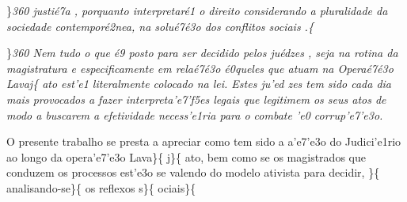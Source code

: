  \ltrch{} 
\par \}\pard \ltrpar\qj {}\sl360\widctlpar\wrapdefault\aspalpha\aspnum\faauto\adjustright{} {\rtlch{}  \ltrch{}  justi\'e7a}{\rtlch{}  \ltrch{} 
 , porquanto interpretar\'e1 o direito considerando}{\rtlch{}  \ltrch{}   a pluralidade da sociedade contempor\'e2nea, }{\rtlch{}  \ltrch{}  
na solu\'e7\'e3o }{\rtlch{}  \ltrch{}  dos conflitos sociais}{\rtlch{}  \ltrch{}  .}\{\rtlch{}
 \ltrch{}
\\
\par \}\pard \ltrpar\qj {}\sl360\widctlpar\wrapdefault\aspalpha\aspnum\faauto\adjustright{} {\rtlch{}  \ltrch{}  Nem tudo o que \'e9
 posto para ser decidido pelos ju\'edzes}{\rtlch{}  \ltrch{}  , seja na rotina da magistratura e especificamente em rela\'e7\'e3o \'e0queles }{\rtlch{}  \ltrch{} 
 que atuam na Opera\'e7\'e3o Lavaj}\{\rtlch{}
 \ltrch{}
 ato
est'e1 literalmente colocado na lei. Estes ju'ed zes tem sido cada dia
mais provocados a fazer interpreta'e7'f5es legais que legitimem os seus
atos de modo a buscarem a efetividade necess'e1ria para o combate 'e0
corrup'e7'e3o. \par O presente trabalho se presta a apreciar como tem
sido a a'e7'e3o do Judici'e1rio ao longo da opera'e7'e3o
Lava\}\{\rtlch{}  \ltrch{}
 j\}\{\rtlch{} 
\ltrch{}
 ato, bem
como se os magistrados que conduzem os processos est'e3o se valendo do
modelo ativista para decidir, \}\{\rtlch{}  \ltrch{}
analisando-se\}\{\rtlch{}  \ltrch{}
 os
reflexos s\}\{\rtlch{}  \ltrch{}
 ociais\}\{\rtlch{}
